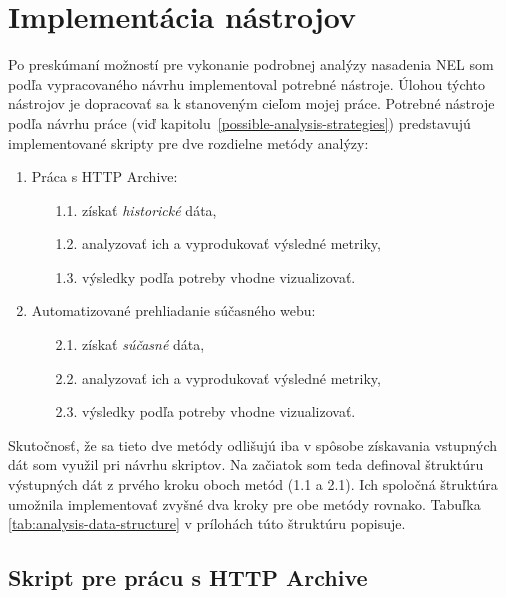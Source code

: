 \chapter{Implementácia nástrojov}

Po preskúmaní možností pre vykonanie podrobnej analýzy nasadenia NEL som podľa vypracovaného návrhu implementoval potrebné nástroje.
Úlohou týchto nástrojov je dopracovať sa k stanoveným cieľom mojej práce.  
Potrebné nástroje podľa návrhu práce (viď \mbox{kapitolu \ref{possible-analysis-strategies})} predstavujú implementované skripty pre dve rozdielne metódy analýzy:
\begin{enumerate}
    \item Práca s HTTP Archive:
    \begin{enumerate}
        \item[1.1.] získať \textit{historické} dáta, 
        \item[1.2.] analyzovať ich a vyprodukovať výsledné metriky,
        \item[1.3.] výsledky podľa potreby vhodne vizualizovať.
    \end{enumerate}

    \item Automatizované prehliadanie súčasného webu:
    \begin{enumerate}
        \item[2.1.] získať \textit{súčasné} dáta,
        \item[2.2.] analyzovať ich a vyprodukovať výsledné metriky, 
        \item[2.3.] výsledky podľa potreby vhodne vizualizovať.
    \end{enumerate}
\end{enumerate}

Skutočnosť, že sa tieto dve metódy odlišujú iba v spôsobe získavania vstupných dát som využil pri návrhu skriptov.
Na začiatok som teda definoval štruktúru výstupných dát z prvého kroku oboch metód (1.1 a 2.1).
Ich spoločná štruktúra umožnila implementovať zvyšné dva kroky pre obe metódy rovnako.
Tabuľka \ref{tab:analysis-data-structure} v prílohách túto štruktúru popisuje. 

\section{Skript pre prácu s HTTP Archive}
\label{query_and_store}

